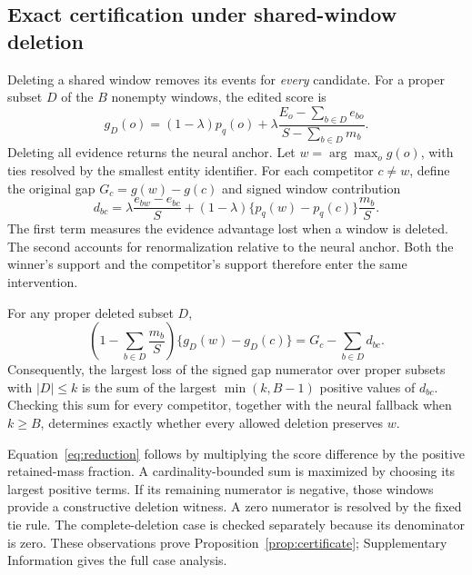 \subsection{Exact certification under shared-window deletion}
Deleting a shared window removes its events for \emph{every} candidate. For a proper subset $D$ of the $B$ nonempty windows, the edited score is
\begin{equation}
g_D(o)=(1-\lambda)p_q(o)+\lambda\frac{E_o-\sum_{b\in D}e_{bo}}{S-\sum_{b\in D}m_b}.
\label{eq:edited}
\end{equation}
Deleting all evidence returns the neural anchor. Let $w=\arg\max_o g(o)$, with ties resolved by the smallest entity identifier. For each competitor $c\ne w$, define the original gap $G_c=g(w)-g(c)$ and signed window contribution
\begin{equation}
d_{bc}=\lambda\frac{e_{bw}-e_{bc}}{S}
 +(1-\lambda)\{p_q(w)-p_q(c)\}\frac{m_b}{S}.
\label{eq:delta}
\end{equation}
The first term measures the evidence advantage lost when a window is deleted. The second accounts for renormalization relative to the neural anchor. Both the winner's support and the competitor's support therefore enter the same intervention.

\begin{proposition}
For any proper deleted subset $D$,
\begin{equation}
\left(1-\sum_{b\in D}\frac{m_b}{S}\right)\{g_D(w)-g_D(c)\}
=G_c-\sum_{b\in D}d_{bc}.
\label{eq:reduction}
\end{equation}
Consequently, the largest loss of the signed gap numerator over proper subsets with $|D|\le k$ is the sum of the largest $\min(k,B-1)$ positive values of $d_{bc}$. Checking this sum for every competitor, together with the neural fallback when $k\ge B$, determines exactly whether every allowed deletion preserves $w$.
\label{prop:certificate}
\end{proposition}

Equation~\eqref{eq:reduction} follows by multiplying the score difference by the positive retained-mass fraction. A cardinality-bounded sum is maximized by choosing its largest positive terms. If its remaining numerator is negative, those windows provide a constructive deletion witness. A zero numerator is resolved by the fixed tie rule. The complete-deletion case is checked separately because its denominator is zero. These observations prove Proposition~\ref{prop:certificate}; Supplementary Information gives the full case analysis.

